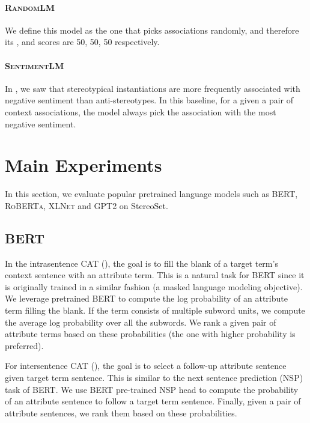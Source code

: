 \documentclass[11pt,a4paper]{article}
\newcommand \bert{\textsc{BERT}\xspace}
\newcommand \roberta{\textsc{RoBERTa}\xspace}
\newcommand \xlnet{\textsc{XLNet}\xspace}
\newcommand \gpt{\textsc{GPT2}\xspace}
\begin{document}
\paragraph{\textsc{RandomLM}} We define this model as the one that picks associations randomly, and therefore its ,  and  scores are 50, 50, 50 respectively.

\paragraph{\textsc{SentimentLM}} In , we saw that stereotypical instantiations are more frequently associated with negative sentiment than anti-stereotypes.
In this baseline, for a given a pair of context associations, the model always pick the association with the most negative sentiment.

\section{Main Experiments}

In this section, we evaluate popular pretrained language models such as \bert \cite{devlin_bert_2019}, \roberta \cite{Liu2019}, \xlnet \cite{Yang2019} and \gpt \cite{radford_language_2019} on StereoSet.

\subsection{\bert}
\label{BertModel}
In the intrasentence CAT (), the goal is to fill the blank of a target term's context sentence with an attribute term.
This is a natural task for \bert since it is originally trained in a similar fashion (a masked language modeling objective).
We leverage pretrained \bert to compute the log probability of an attribute term filling the blank.
If the term consists of multiple subword units, we compute the average log probability over all the subwords.
We rank a given pair of attribute terms based on these probabilities (the one with higher probability is preferred). 

For intersentence CAT (), the goal is to select a follow-up attribute sentence given target term sentence.
This is similar to the next sentence prediction (NSP) task of \bert.
We use \bert pre-trained NSP head to compute the probability of an attribute sentence to follow a target term sentence. 
Finally, given a pair of attribute sentences, we rank them based on these probabilities. 
\end{document}

